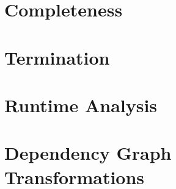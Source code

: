 \section{Completeness}\label{sec:bc-completeness}

\section{Termination}\label{sec:bc-termination}

\section{Runtime Analysis}\label{sec:bc-runtime-analysis}

\section{Dependency Graph Transformations}\label{sec:dep-graph-trans}

